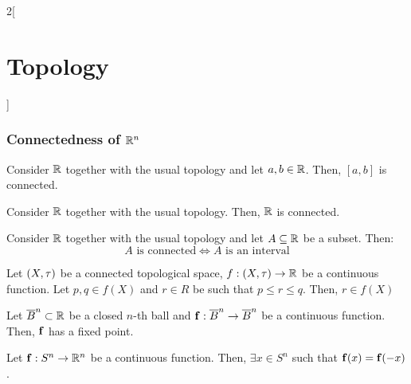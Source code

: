 \documentclass[../../../main.tex]{subfiles}
\begin{document}
\begin{multicols}{2}[\section{Topology}]
    \subsubsection{Connectedness of \texorpdfstring{$\mathbb{R}^n$}{Rn}}
    \begin{theorem}
        Consider $\mathbb{R}$ together with the usual topology and let $a,b\in\mathbb{R}$. Then, $[a,b]$ is connected.
    \end{theorem}
    \begin{theorem}
        Consider $\mathbb{R}$ together with the usual topology. Then, $\mathbb{R}$ is connected.
    \end{theorem}
    \begin{theorem}
        Consider $\mathbb{R}$ together with the usual topology and let $A\subseteq \mathbb{R}$ be a subset. Then: $$A\text{ is connected}\iff A\text{ is an interval}$$
    \end{theorem}
    \begin{theorem}
        Let $(X,\tau)$ be a connected topological space, $f:(X,\tau)\rightarrow\mathbb{R}$ be a continuous function. Let $p,q\in f(X)$ and $r\in R$ be such that $p\leq r\leq q$. Then, $r\in f(X)$
    \end{theorem}
    \begin{theorem}
        Let $\overline{B}^n\subset\mathbb{R}$ be a closed $n$-th ball and $\boldsymbol{\mathrm{f}}:\overline{B}^n\rightarrow\overline{B}^n$ be a continuous function. Then, $\boldsymbol{\mathrm{f}}$ has a fixed point.
    \end{theorem}
    \begin{theorem}
        Let $\boldsymbol{\mathrm{f}}:S^n\rightarrow\mathbb{R}^n$ be a continuous function. Then, $\exists x\in S^n$ such that $\boldsymbol{\mathrm{f}}(x)=\boldsymbol{\mathrm{f}}(-x)$.
    \end{theorem}

\end{multicols}
\end{document}
